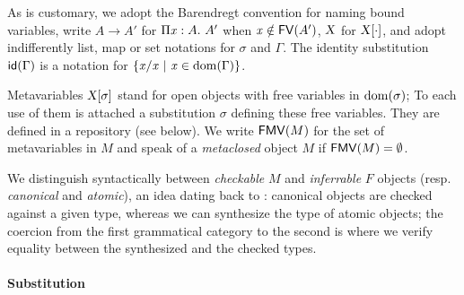 \documentclass{llncs}
\begin{document}
As is customary, we adopt the Barendregt convention for naming bound
variables, write $A\to A'$ for $\Pi{\ensuremath{\text{\textit{x}}}}:{A}.\  A'$ when $\text{\textit{x}}\notin {\text{\textsf{FV}}}({A'})$,
$\text{\textsl{X}}$ for ${\text{\textsl{X}}}[{\cdot}]$, and adopt indifferently list, map
or set notations for $\sigma$ and $\Gamma$. The identity substitution
${\text{\textsf{id}}}({\Gamma})$ is a notation for $\{{\text{\textit{x}}}/{\text{\textit{x}}}\ |\ \text{\textit{x}}
\in\operatorname{dom}{\!(\Gamma)}\}$.

Metavariables ${\text{\textsl{X}}}[{\sigma}]$ stand for open objects with free
variables in $\operatorname{dom}{\!(\sigma)}$; To each use of them is attached a
substitution $\sigma$ defining these free variables. They are defined
in a repository (see below). We write ${\text{\textsf{FMV}}}({M})$ for the set of
metavariables in $M$ and speak of a \emph{metaclosed} object $M$ if
${\text{\textsf{FMV}}}({M}) = \emptyset$.

We distinguish syntactically between \emph{checkable} $M$ and
\emph{inferrable} $F$ objects (resp. \emph{canonical} and
\emph{atomic}), an idea dating back to \cite{pierce2000local}:
canonical objects are checked against a given type, whereas we can
synthesize the type of atomic objects; the coercion from the first
grammatical category to the second is where we verify equality between
the synthesized and the checked types.

\paragraph{Substitution}
\end{document}
